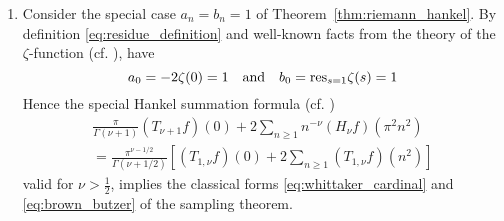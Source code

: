 \documentclass{article}
\begin{document}
\begin{remark}
\begin{enumerate}
    \item Consider the special case $a_n = b_n = 1$ of
    Theorem~\ref{thm:riemann_hankel}. By definition
    \eqref{eq:residue_definition} and well-known facts from the theory of the
    $\zeta$-function (cf. {\cite{30}}), have
    \begin{equation}
      a_0 = - 2 \zeta (0) = 1 \text{\quad and\quad} b_0 = \mathrm{res}_{s = 1}
      \zeta (s) = 1 \label{eq:zeta_values}
    \end{equation}
    Hence the special Hankel summation formula (cf. {\cite{17,24}})
    \begin{equation}
      \begin{array}{l}
        \frac{\pi}{\Gamma (\nu + 1)}  (T_{\nu + 1} f) (0) + 2 \sum_{n \geq 1}
        n^{- \nu}  (H_{\nu} f)  (\pi^2 n^2)\\
        = \frac{\pi^{\nu - 1 / 2}}{\Gamma (\nu + 1 / 2)}  \left[ (T_{1, \nu}
        f) (0) + 2 \sum_{n \geq 1} (T_{1, \nu} f) (n^2) \right]
      \end{array} \label{eq:special_hankel}
    \end{equation}
    valid for $\nu > \frac{1}{2}$, implies the classical forms
    \eqref{eq:whittaker_cardinal} and \eqref{eq:brown_butzer} of the sampling
    theorem.
  \end{enumerate}
\end{remark}
\end{document}
